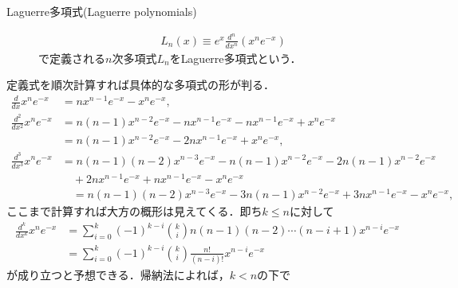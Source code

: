 \documentclass[a4j,papersize,disablejfam,slide,14pt]{jsarticle}
\def\exp#1{e^{#1}} %
\begin{document}
    \begin{screen}
    	\begin{description}
    		\item[{\rm Laguerre}多項式({\rm Laguerre polynomials})]
            \begin{align}
            	L_n(x) \equiv \exp{x} \frac{d^n}{dx^n} (x^n \exp{-x})
            \end{align}
            で定義される$n$次多項式$L_n$を{\rm Laguerre}多項式という．
    	\end{description}
    \end{screen}
    
    定義式を順次計算すれば具体的な多項式の形が判る．
    \begin{align}
    	\frac{d}{dx} x^n \exp{-x} &= n x^{n-1} \exp{-x} - x^n \exp{-x}, \\
        \frac{d^2}{dx^2} x^n \exp{-x} &= n(n-1) x^{n-2} \exp{-x} - n x^{n-1} \exp{-x} - n x^{n-1} \exp{-x} + x^n \exp{-x} \\
        	&= n(n-1) x^{n-2} \exp{-x} - 2n x^{n-1} \exp{-x} + x^n \exp{-x}, \\
        \frac{d^3}{dx^3} x^n \exp{-x} &= n(n-1)(n-2) x^{n-3} \exp{-x} - n(n-1) x^{n-2} \exp{-x} - 2n(n-1) x^{n-2} \exp{-x} \\
        	&\quad+ 2n x^{n-1} \exp{-x} + n x^{n-1} \exp{-x} - x^n \exp{-x} \\
            &\quad= n(n-1)(n-2) x^{n-3} \exp{-x} -3 n(n-1) x^{n-2} \exp{-x} + 3 n x^{n-1} \exp{-x} - x^n \exp{-x},
    \end{align}
    ここまで計算すれば大方の概形は見えてくる．即ち$k \leq n$に対して
    \begin{align}
    	\frac{d^k}{dx^k} x^n \exp{-x} &= \sum_{i=0}^{k} (-1)^{k-i} \binom{k}{i} n(n-1)(n-2)\cdots(n-i+1) x^{n-i} \exp{-x} \\
        &= \sum_{i=0}^{k} (-1)^{k-i} \binom{k}{i} \frac{n!}{(n-i)!} x^{n-i} \exp{-x} \label{eq:laguerre_k_deriv}
    \end{align}
    が成り立つと予想できる．帰納法によれば，$k<n$の下で
\end{document}

